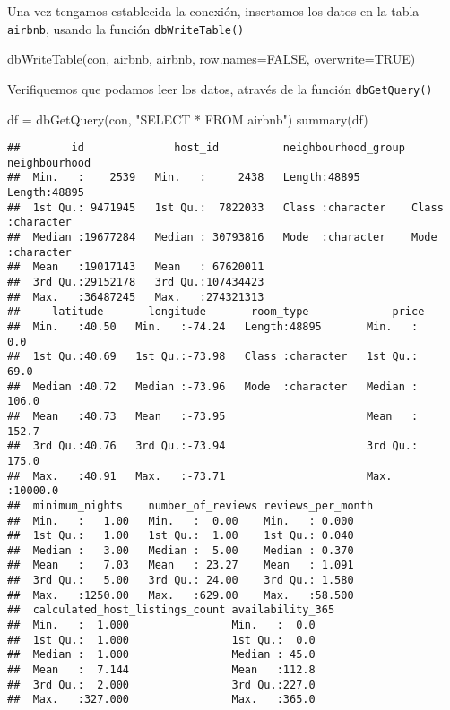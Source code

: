 \documentclass[
]{book}
\newenvironment{Shaded}{\begin{snugshade}}{\end{snugshade}}
\newcommand{\AttributeTok}[1]{\textcolor[rgb]{0.77,0.63,0.00}{#1}}
\newcommand{\ConstantTok}[1]{\textcolor[rgb]{0.00,0.00,0.00}{#1}}
\newcommand{\FunctionTok}[1]{\textcolor[rgb]{0.00,0.00,0.00}{#1}}
\newcommand{\NormalTok}[1]{#1}
\newcommand{\OtherTok}[1]{\textcolor[rgb]{0.56,0.35,0.01}{#1}}
\newcommand{\StringTok}[1]{\textcolor[rgb]{0.31,0.60,0.02}{#1}}
\begin{document}
Una vez tengamos establecida la conexión, insertamos los datos en la tabla \texttt{airbnb}, usando la función \texttt{dbWriteTable()}

\begin{Shaded}
\begin{Highlighting}[]
\FunctionTok{dbWriteTable}\NormalTok{(con, }\StringTok{\textquotesingle{}airbnb\textquotesingle{}}\NormalTok{, airbnb, }\AttributeTok{row.names=}\ConstantTok{FALSE}\NormalTok{, }\AttributeTok{overwrite=}\ConstantTok{TRUE}\NormalTok{)}
\end{Highlighting}
\end{Shaded}

Verifiquemos que podamos leer los datos, através de la función \texttt{dbGetQuery()}

\begin{Shaded}
\begin{Highlighting}[]
\NormalTok{df }\OtherTok{=} \FunctionTok{dbGetQuery}\NormalTok{(con, }\StringTok{"SELECT * FROM airbnb"}\NormalTok{)}
\FunctionTok{summary}\NormalTok{(df)}
\end{Highlighting}
\end{Shaded}

\begin{verbatim}
##        id              host_id          neighbourhood_group neighbourhood     
##  Min.   :    2539   Min.   :     2438   Length:48895        Length:48895      
##  1st Qu.: 9471945   1st Qu.:  7822033   Class :character    Class :character  
##  Median :19677284   Median : 30793816   Mode  :character    Mode  :character  
##  Mean   :19017143   Mean   : 67620011                                         
##  3rd Qu.:29152178   3rd Qu.:107434423                                         
##  Max.   :36487245   Max.   :274321313                                         
##     latitude       longitude       room_type             price        
##  Min.   :40.50   Min.   :-74.24   Length:48895       Min.   :    0.0  
##  1st Qu.:40.69   1st Qu.:-73.98   Class :character   1st Qu.:   69.0  
##  Median :40.72   Median :-73.96   Mode  :character   Median :  106.0  
##  Mean   :40.73   Mean   :-73.95                      Mean   :  152.7  
##  3rd Qu.:40.76   3rd Qu.:-73.94                      3rd Qu.:  175.0  
##  Max.   :40.91   Max.   :-73.71                      Max.   :10000.0  
##  minimum_nights    number_of_reviews reviews_per_month
##  Min.   :   1.00   Min.   :  0.00    Min.   : 0.000   
##  1st Qu.:   1.00   1st Qu.:  1.00    1st Qu.: 0.040   
##  Median :   3.00   Median :  5.00    Median : 0.370   
##  Mean   :   7.03   Mean   : 23.27    Mean   : 1.091   
##  3rd Qu.:   5.00   3rd Qu.: 24.00    3rd Qu.: 1.580   
##  Max.   :1250.00   Max.   :629.00    Max.   :58.500   
##  calculated_host_listings_count availability_365
##  Min.   :  1.000                Min.   :  0.0   
##  1st Qu.:  1.000                1st Qu.:  0.0   
##  Median :  1.000                Median : 45.0   
##  Mean   :  7.144                Mean   :112.8   
##  3rd Qu.:  2.000                3rd Qu.:227.0   
##  Max.   :327.000                Max.   :365.0
\end{verbatim}
\end{document}
